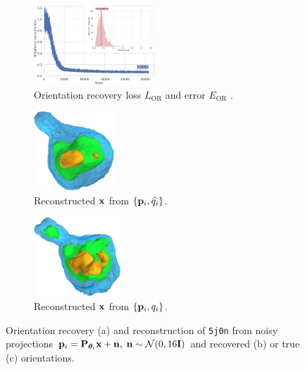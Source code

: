 \begin{figure}[t]
    \centering
    \begin{subfigure}[b]{0.42\textwidth}
        \centering
        \includegraphics[width=\linewidth,height=8em]{figures/5j0n_noise16_ar_aa}
        \caption{Orientation recovery loss $L_\text{OR}$  and error $E_\text{OR}$ .}%
        \label{fig:5j0n-noise16-orientation-recovery}
    \end{subfigure}
    \hfill
    \begin{subfigure}[b]{0.27\linewidth}
        \centering
        \includegraphics[height=8em]{figures/5j0n_reconstruction_noise16}
        \caption{Reconstructed $\mathbf{x}$ from $\{ \mathbf{p}_i, \widehat{q_i} \}$.}%
        \label{fig:5j0n-noise16-reconstruction-recovered}
    \end{subfigure}
    \hfill
    \begin{subfigure}[b]{0.27\linewidth}
        \centering
        \includegraphics[height=8em]{figures/5j0n_reconstruction_GT_noise16}
        \caption{Reconstructed $\mathbf{x}$ from $\{ \mathbf{p}_i, q_i \}$.}%
        \label{fig:5j0n-noise16-reconstruction-true}
    \end{subfigure}
    \caption{%
        Orientation recovery (a) and reconstruction of \texttt{5j0n} from noisy projections $\mathbf{p}_i = \mathbf{P}_{{\boldsymbol{\theta}}_i} \mathbf{x} + \mathbf{n}, \; \mathbf{n} \sim \mathcal{N}(0, 16\mathbf{I})$ and recovered (b) or true (c) orientations.
    }
\end{figure}

